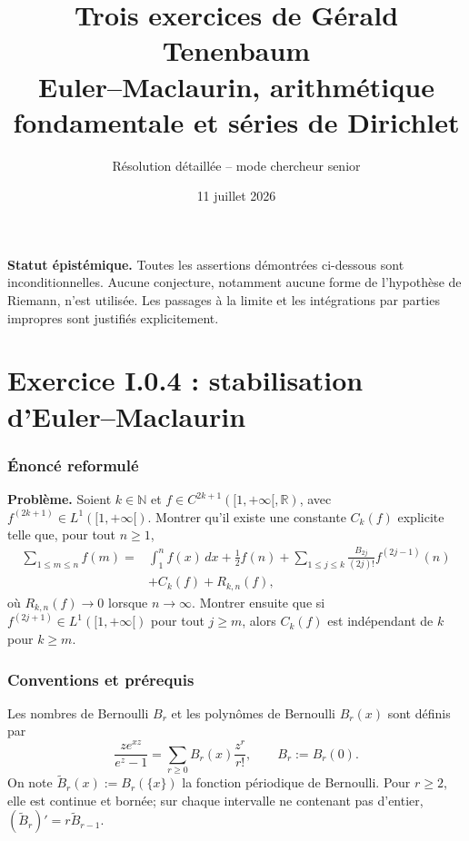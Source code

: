 \documentclass[11pt,a4paper]{article}
\title{Trois exercices de G\'erald Tenenbaum\\
\large Euler--Maclaurin, arithm\'etique fondamentale et s\'eries de Dirichlet}
\author{R\'esolution d\'etaill\'ee -- mode chercheur senior}
\date{11 juillet 2026}
\newcommand{\R}{\mathbb{R}}
\newcommand{\N}{\mathbb{N}}
\newcommand{\Bper}[1]{\widetilde B_{#1}}
\begin{document}
\maketitle
\tableofcontents

\begin{remarkbox}
\textbf{Statut \'epist\'emique.}
Toutes les assertions d\'emontr\'ees ci-dessous sont inconditionnelles. Aucune
conjecture, notamment aucune forme de l'hypoth\`ese de Riemann, n'est utilis\'ee.
Les passages \`a la limite et les int\'egrations par parties impropres sont
justifi\'es explicitement.
\end{remarkbox}

\part{Exercice I.0.4 : stabilisation d'Euler--Maclaurin}

\section{\'Enonc\'e reformul\'e}

\begin{theorembox}
\textbf{Probl\`eme.}
Soient $k\in\N$ et $f\in C^{2k+1}([1,+\infty[,\R)$, avec
$f^{(2k+1)}\in L^1([1,+\infty[)$. Montrer qu'il existe une constante
$C_k(f)$ explicite telle que, pour tout $n\geq1$,
\begin{align*}
\sum_{1\leq m\leq n}f(m)
={}&\int_1^n f(x)\,dx+\frac12f(n)
+\sum_{1\leq j\leq k}\frac{B_{2j}}{(2j)!}f^{(2j-1)}(n)\\
&+C_k(f)+R_{k,n}(f),
\end{align*}
o\`u $R_{k,n}(f)\to0$ lorsque $n\to\infty$. Montrer ensuite que si
$f^{(2j+1)}\in L^1([1,+\infty[)$ pour tout $j\geq m$, alors $C_k(f)$ est
ind\'ependant de $k$ pour $k\geq m$.
\end{theorembox}

\section{Conventions et pr\'erequis}

\begin{definitionbox}
Les nombres de Bernoulli $B_r$ et les polyn\^omes de Bernoulli $B_r(x)$ sont
d\'efinis par
\[
 \frac{ze^{xz}}{e^z-1}=\sum_{r\geq0}B_r(x)\frac{z^r}{r!},
 \qquad B_r:=B_r(0).
\]
On note $\Bper r(x):=B_r(\{x\})$ la fonction p\'eriodique de Bernoulli. Pour
$r\geq2$, elle est continue et born\'ee; sur chaque intervalle ne contenant pas
d'entier, $(\Bper r)'=r\Bper{r-1}$.
\end{definitionbox}
\end{document}
